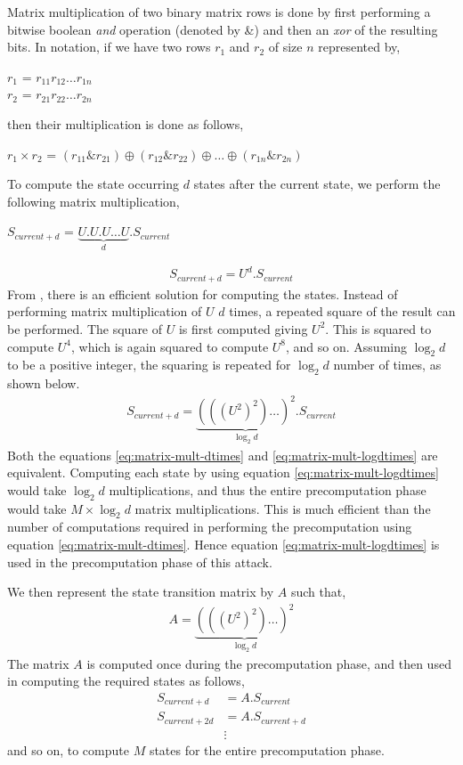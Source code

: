 Matrix multiplication of two binary matrix rows is done by first performing a bitwise boolean \emph{and} operation (denoted by \&) and then an \emph{xor} of the resulting bits. In notation, if we have two rows $r_1$ and $r_2$ of size $n$ represented by,
\begin{center}
$r_1$ = $r_{11} r_{12} \ldots r_{1n}$\\
$r_2$ = $r_{21} r_{22} \ldots r_{2n}$
\end{center}
then their multiplication is done as follows,
\begin{center}
$r_1 \times r_2$ = $(r_{11} \& r_{21}) \oplus (r_{12} \& r_{22}) \oplus \ldots \oplus (r_{1n} \& r_{2n})$
\end{center}
To compute the state occurring $d$ states after the current state, we perform the following matrix multiplication,
\begin{center}
$S_{current + d}$ = $\underbrace{U . U . U \dots U}_{d} . S_{current}$\\
\end{center}
\begin{align}
\label{eq:matrix-mult-dtimes} S_{current + d} = U^d . S_{current}
\end{align}
From \cite{erik-discussions}, there is an efficient solution for computing the states. Instead of performing matrix multiplication of $U$ $d$ times, a repeated square of the result can be performed. The square of $U$ is first computed giving $U^2$. This is squared to compute $U^4$, which is again squared to compute $U^8$, and so on. Assuming $\log_2{d}$ to be a positive integer, the squaring is repeated for $\log_2{d}$ number of times, as shown below.
\begin{align}
\label{eq:matrix-mult-logdtimes} S_{current + d} = \underbrace{(((U^2)^2) \dotsc )^2}_{\log_2{d}} . S_{current}
\end{align}
Both the equations \ref{eq:matrix-mult-dtimes} and \ref{eq:matrix-mult-logdtimes} are equivalent. Computing each state by using equation \ref{eq:matrix-mult-logdtimes} would take $\log_2{d}$ multiplications, and thus the entire precomputation phase would take $M \times \log_2{d}$ matrix multiplications. This is much efficient than the number of computations required in performing the precomputation using equation \ref{eq:matrix-mult-dtimes}. Hence equation \ref{eq:matrix-mult-logdtimes} is used in the precomputation phase of this attack.

We then represent the state transition matrix by $A$ such that,
\begin{align}
\label{eq:state-trans-matrix} A = \underbrace{(((U^2)^2) \dotsc )^2}_{\log_2{d}}
\end{align}
The matrix $A$ is computed once during the precomputation phase, and then used in computing the required states as follows,
\begin{align*}
S_{current + d} &= A . S_{current}\\
S_{current + 2d} &= A . S_{current + d}\\
&\vdots
\end{align*}
and so on, to compute $M$ states for the entire precomputation phase.

